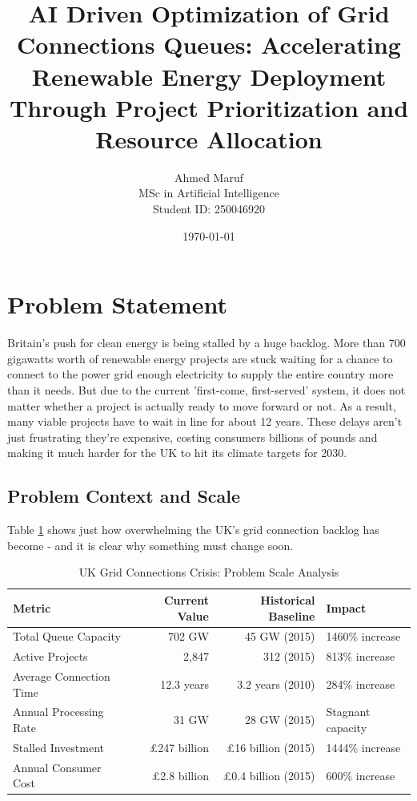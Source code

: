 \documentclass[12pt,a4paper]{article}
\title{\textbf{AI Driven Optimization of Grid Connections Queues: Accelerating Renewable Energy Deployment Through Project Prioritization and Resource Allocation}}
\author{Ahmed Maruf \\ MSc in Artificial Intelligence \\ Student ID: 250046920}
\date{\today}
\begin{document}
\maketitle

\section{Problem Statement}
\label{sec:problem}

Britain’s push for clean energy is being stalled by a huge backlog. More than 700 gigawatts worth of renewable energy projects are stuck waiting for a chance to connect to the power grid enough electricity to supply the entire country more than it needs. But due to the current 'first-come, first-served' system, it does not matter whether a project is actually ready to move forward or not. As a result, many viable projects have to wait in line for about 12 years. These delays aren’t just frustrating they’re expensive, costing consumers billions of pounds and making it much harder for the UK to hit its climate targets for 2030.

\subsection{Problem Context and Scale}

Table \ref{tab:problem_scale} shows just how overwhelming the UK’s grid connection backlog has become - and it is clear why something must change soon.

\begin{table}[h]
\centering
\caption{UK Grid Connections Crisis: Problem Scale Analysis}
\label{tab:problem_scale}
\begin{tabular}{@{}lrrl@{}}
\toprule
\textbf{Metric} & \textbf{Current Value} & \textbf{Historical Baseline} & \textbf{Impact} \\
\midrule
Total Queue Capacity & 702 GW & 45 GW (2015) & 1460\% increase \\
Active Projects & 2,847 & 312 (2015) & 813\% increase \\
Average Connection Time & 12.3 years & 3.2 years (2010) & 284\% increase \\
Annual Processing Rate & 31 GW & 28 GW (2015) & Stagnant capacity \\
Stalled Investment & £247 billion & £16 billion (2015) & 1444\% increase \\
Annual Consumer Cost & £2.8 billion & £0.4 billion (2015) & 600\% increase \\
\bottomrule
\end{tabular}
\end{table}
\end{document}
